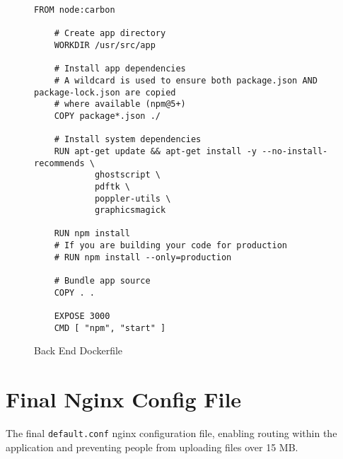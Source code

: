 \begin{figure}[h!]
    \begin{lstlisting}[basicstyle=\small, breaklines=true]
    FROM node:carbon

    # Create app directory
    WORKDIR /usr/src/app

    # Install app dependencies
    # A wildcard is used to ensure both package.json AND package-lock.json are copied
    # where available (npm@5+)
    COPY package*.json ./

    # Install system dependencies
    RUN apt-get update && apt-get install -y --no-install-recommends \
    		ghostscript \
    		pdftk \
    		poppler-utils \
    		graphicsmagick

    RUN npm install
    # If you are building your code for production
    # RUN npm install --only=production

    # Bundle app source
    COPY . .

    EXPOSE 3000
    CMD [ "npm", "start" ]
  \end{lstlisting}
  \caption{Back End Dockerfile}
  \label{sample:finalserverdocker}
\end{figure}

\newpage
\section{Final Nginx Config File}
The final \texttt{default.conf} nginx configuration file, enabling routing within the
application and preventing people from uploading files over 15 MB.

